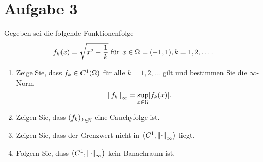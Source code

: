 \documentclass{exercise}
\begin{document}
    \section*{Aufgabe 3}

    \begin{problem}
        Gegeben sei die folgende Funktionenfolge
        \[
            f_k\parentheses*{x} = \sqrt{x^2 + \frac{1}{k}}\text{ für }x \in \Omega = \parentheses*{-1, 1}, k = 1, 2, \ldots.
        \]
        \begin{enumerate}
            \item Zeige Sie, dass \(f_k \in C^1\parentheses*{\Omega}\) für alle \(k = 1, 2, \ldots\) gilt und bestimmen Sie die \(\infty\)-Norm
            \[
                \norm*{f_k}_\infty = \sup_{x \in \Omega}\absolute*{f_k\parentheses*{x}}.
            \]
            \item Zeigen Sie, dass \(\parentheses*{f_k}_{k \in \N}\) eine Cauchyfolge ist.
            \item Zeigen Sie, dass der Grenzwert nicht in \(\parentheses*{C^1, \norm*{\cdot}_\infty}\) liegt.
            \item Folgern Sie, dass \(\parentheses*{C^1, \norm*{\cdot}_\infty}\) kein Banachraum ist.
        \end{enumerate}
    \end{problem}
\end{document}
